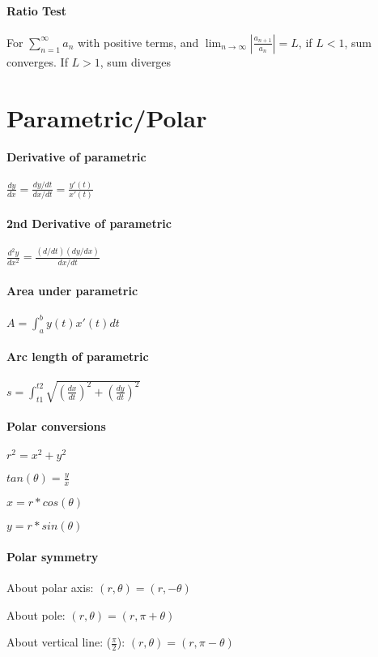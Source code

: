 \documentclass[10pt,landscape]{article}
\begin{document}
\begin{multicols}{4}
\paragraph{Ratio Test}
For $\sum_{n=1}^{\infty}a_n$  with positive terms, and $\lim_{n\rightarrow\infty}|\frac{a_{n+1}}{a_n}| = L$, if $L < 1$, sum converges. If $L > 1$, sum diverges


\section{Parametric/Polar}

\paragraph{Derivative of parametric}
$\frac{dy}{dx} = \frac{dy/dt}{dx/dt} = \frac{y'(t)}{x'(t)}$


\paragraph{2nd Derivative of parametric}
$\frac{d^2y}{dx^2} = \frac{(d/dt)(dy/dx)}{dx/dt}$

\paragraph{Area under parametric}
$A = \int_{a}^{b}y(t)x'(t)dt$


\paragraph{Arc length of parametric}
$s = \int_{t1}^{t2} \sqrt{(\frac{dx}{dt})^2+(\frac{dy}{dt})^2}$

\paragraph{Polar conversions}
$r^2 = x^2 + y^2$

$tan(\theta) = \frac{y}{x}$

$x = r * cos(\theta)$

$y = r * sin(\theta)$

\paragraph{Polar symmetry}

About polar axis: $(r, \theta) = (r, -\theta)$

About pole: $(r, \theta) = (r, \pi + \theta)$

About vertical line: ($\frac{\pi}{2}$): $(r, \theta) = (r, \pi - \theta)$

		
	\end{multicols}
\end{document}
